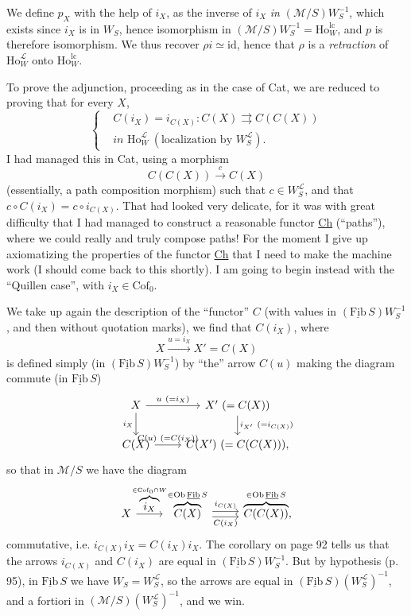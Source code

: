 \documentclass[11pt]{article}
\newcommand{\printedpage}[1]{\marginpar{\footnotesize p.~#1}}
\newcommand{\msp}[1]{\marginpar{\footnotesize [#1]}}
\newcommand{\Fibu}{\underline{\mathrm{Fib}}\,}
\newcommand{\Ho}{\mathrm{Ho}}
\newcommand{\WL}{W_S^{\mathcal{L}}}
\begin{document}
We define $p_X$ with the help of $i_X$, as the inverse of $i_X$ \textit{in} $(\mathcal{M}/S)W_S^{-1}$, which exists since \msp{page 99} $i_X$ is in $W_S$, hence isomorphism in $(\mathcal{M}/S)W_S^{-1} = \Ho_W^{\mathrm{lc}}$, and $p$ is therefore isomorphism. We thus recover $\rho i \simeq \mathrm{id}$, hence that $\rho$ is a \textit{retraction} of $\Ho_W^{\mathcal{L}}$ onto $\Ho_W^{\mathrm{lc}}$.

To prove the adjunction, proceeding as in the case of Cat, we are reduced to proving that for every $X$,
\[
\left\{
\begin{aligned}
&C(i_X) = i_{C(X)} : C(X) \rightrightarrows C(C(X))\\
&\textit{in } \Ho_W^{\mathcal{L}} \ (\text{localization by } \WL).
\end{aligned}
\right.
\]
I had managed this in Cat, using a morphism
\[
C(C(X)) \xrightarrow{\ c\ } C(X)
\]
(essentially, a path composition morphism) such that $c \in \WL$, and that $c \circ C(i_X) = c \circ i_{C(X)}$. That had looked very delicate, for it was with great difficulty that I had managed to construct a reasonable functor \underline{Ch} (``paths''), where we could really and truly compose paths! For the moment I give up axiomatizing the properties of the functor \underline{Ch} that I need to make the machine work (I should come back to this shortly). I am going to begin instead with the ``Quillen case'', with $i_X \in \mathrm{Cof}_0$.

\printedpage{63}
\msp{page 100}

We take up again the description of the ``functor'' $C$ (with values in $(\Fibu S)W_S^{-1}$, and then without quotation marks), we find that $C(i_X)$, where
\[
X \xrightarrow{u = i_X} X' = C(X)
\]
is defined simply (in $(\Fibu S)W_S^{-1}$) by ``the'' arrow $C(u)$ making the diagram commute (in $\Fibu S$)
\[
\begin{tikzcd}
X \arrow[r, "u\ (=i_X)"] \arrow[d, "i_X"'] & X'\ (= C(X)) \arrow[d, "i_{X'}\ (=i_{C(X)})"] \\
C(X) \arrow[r, "C(u)\ (=C(i_X))"] & C(X')\ (= C(C(X))),
\end{tikzcd}
\]
so that in $\mathcal{M}/S$ we have the diagram
\[
\begin{tikzcd}
X \arrow[r, "\overbrace{i_X}^{\in\mathrm{Cof}_0\cap W}"] & \overbrace{C(X)}^{\in\mathrm{Ob}\,\Fibu S} \arrow[r, shift left, "i_{C(X)}"] \arrow[r, shift right, "C(i_X)"'] & \overbrace{C(C(X))}^{\in\mathrm{Ob}\,\Fibu S},
\end{tikzcd}
\]
commutative, i.e. $i_{C(X)}i_X = C(i_X)i_X$. The corollary on page 92 tells us that the arrows $i_{C(X)}$ and $C(i_X)$ are equal in $(\Fibu S)W_S^{-1}$. But by hypothesis (p. 95), in $\Fibu S$ we have $W_S = \WL$, so the arrows are equal in $(\Fibu S)(\WL)^{-1}$, and a fortiori in $(\mathcal{M}/S)(\WL)^{-1}$, and we win.
\end{document}
